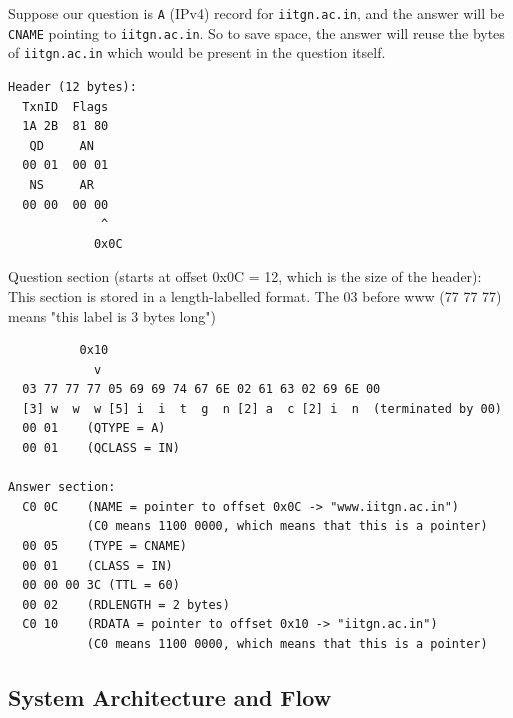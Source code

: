 \documentclass{article}
\begin{document}
Suppose our question is \texttt{A} (IPv4) record for \texttt{iitgn.ac.in}, and the answer will be \texttt{CNAME} pointing to \texttt{iitgn.ac.in}. So to save space, the answer will reuse the bytes of \texttt{iitgn.ac.in} which would be present in the question itself.

\begin{lstlisting}
Header (12 bytes):
  TxnID  Flags  
  1A 2B  81 80  
   QD     AN  
  00 01  00 01 
   NS     AR 
  00 00  00 00
             ^
            0x0C                                                       

\end{lstlisting}
Question section (starts at offset 0x0C = 12, which is the size of the header): 
This section is stored in a length-labelled format. The 03 before www (77 77
77) means "this label is 3 bytes long")
\begin{lstlisting}
          0x10
            v 
  03 77 77 77 05 69 69 74 67 6E 02 61 63 02 69 6E 00
  [3] w  w  w [5] i  i  t  g  n [2] a  c [2] i  n  (terminated by 00)
  00 01    (QTYPE = A)
  00 01    (QCLASS = IN)

Answer section:
  C0 0C    (NAME = pointer to offset 0x0C -> "www.iitgn.ac.in")
           (C0 means 1100 0000, which means that this is a pointer)
  00 05    (TYPE = CNAME)
  00 01    (CLASS = IN)
  00 00 00 3C (TTL = 60)
  00 02    (RDLENGTH = 2 bytes)
  C0 10    (RDATA = pointer to offset 0x10 -> "iitgn.ac.in")
           (C0 means 1100 0000, which means that this is a pointer)
\end{lstlisting}



\subsection{System Architecture and Flow}
\end{document}
